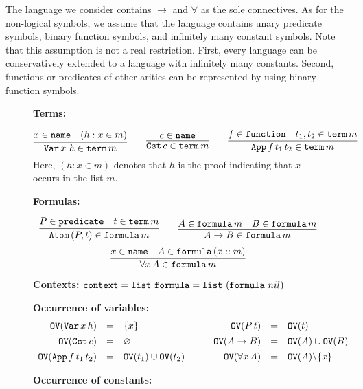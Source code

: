 \documentclass{kms-j}
\theoremstyle{plain}
\theoremstyle{remark}
\begin{document}
The language we consider contains $\to$ and $\forall$ as the sole
connectives.
As for the non-logical symbols, we assume that the language contains
unary predicate symbols, binary function symbols, and infinitely many constant symbols.
Note that this assumption is not a real restriction. First, every language can be conservatively extended to a language with infinitely many constants. Second, functions or predicates of other arities can be represented  by using binary function symbols.

\begin{figure}[t]
\raggedright

\textbf{Terms:}

\[
\vcenter{\seq{x \in \tnat & (h: x \in m)}{\tBvar\, x\,\, h \in \tpterm \, m}}
\qquad
\vcenter{\seq{c \in \tnat}{\tCst \, c \in \tpterm\, m}}
\qquad
\vcenter{\seq{f \in \tfunction & t_1, t_2\in \tpterm\, m}{\tApp\, f\, t_1\, t_2 \in \tpterm\, m}}
\]
Here, $(h:x \in m)$ denotes that $h$ is the proof indicating that $x$ occurs in the list $m$.\medskip

\textbf{Formulas:}

 \[
  \seq{P\in \tpredicate & t \in \tpterm\, m}{\tAtom \, (P, t) \in \tpfml \, m}\qquad
  \seq{A \in \tpfml\, m & B \in \tpfml \, m}{A\to B \in \tpfml\, m}
  \]
  \[
  \seq{x \in \tnat & A \in \tpfml \, (x :: m)}{\forall x\, A \in \tpfml\, m}
  \]


\textbf{Contexts:} $\textup{\tt context} = \textup{\tt list}\,\, \textup{\tt formula} = \textup{\tt list}\,\, (\textup{\tt formula}\,\, nil)$\medskip

\textbf{Occurrence of variables:}
\[
\begin{array}{rcl}
  \textup{\tt OV}(\textup{\tt Var}\, x\, h) & = & \{ x \}\\[1ex]
  \textup{\tt OV}(\textup{\tt Cst}\, c) & = & \varnothing\\[1ex]
  \textup{\tt OV}(\textup{\tt App}\, f\, t_1\, t_2) & = & \textup{\tt OV}(t_1) \cup \textup{\tt OV}(t_2)
\end{array} \qquad
\begin{array}{rcl}
  \textup{\tt OV}(P\, t) & = & \textup{\tt OV}(t)\\[1ex]
  \textup{\tt OV}(A \to B) & = & \textup{\tt OV}(A) \cup \textup{\tt OV}(B)\\[1ex]
  \textup{\tt OV}(\forall x\, A) & = & \textup{\tt OV}(A) \backslash \{ x \}
\end{array}
\]

\textbf{Occurrence of constants:}


\end{figure}
\end{document}
